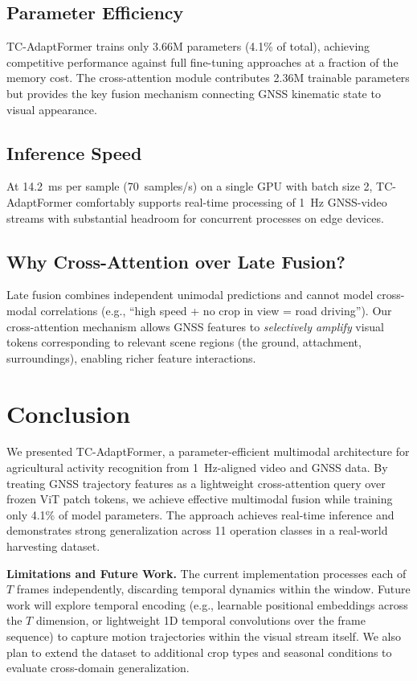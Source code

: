 \documentclass[10pt,twocolumn]{article}
\begin{document}
\subsection{Parameter Efficiency}
TC-AdaptFormer trains only 3.66M parameters (4.1\% of total), achieving competitive performance against full fine-tuning approaches at a fraction of the memory cost. The cross-attention module contributes 2.36M trainable parameters but provides the key fusion mechanism connecting GNSS kinematic state to visual appearance.

\subsection{Inference Speed}
At 14.2~ms per sample (70~samples/s) on a single GPU with batch size 2, TC-AdaptFormer comfortably supports real-time processing of 1~Hz GNSS-video streams with substantial headroom for concurrent processes on edge devices.

\subsection{Why Cross-Attention over Late Fusion?}
Late fusion combines independent unimodal predictions and cannot model cross-modal correlations (e.g., ``high speed + no crop in view = road driving''). Our cross-attention mechanism allows GNSS features to \emph{selectively amplify} visual tokens corresponding to relevant scene regions (the ground, attachment, surroundings), enabling richer feature interactions.

\section{Conclusion}

We presented TC-AdaptFormer, a parameter-efficient multimodal architecture for agricultural activity recognition from 1~Hz-aligned video and GNSS data. By treating GNSS trajectory features as a lightweight cross-attention query over frozen ViT patch tokens, we achieve effective multimodal fusion while training only 4.1\% of model parameters. The approach achieves real-time inference and demonstrates strong generalization across 11 operation classes in a real-world harvesting dataset.

\textbf{Limitations and Future Work.} The current implementation processes each of $T$ frames independently, discarding temporal dynamics within the window. Future work will explore temporal encoding (e.g., learnable positional embeddings across the $T$ dimension, or lightweight 1D temporal convolutions over the frame sequence) to capture motion trajectories within the visual stream itself. We also plan to extend the dataset to additional crop types and seasonal conditions to evaluate cross-domain generalization.



\end{document}
